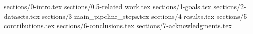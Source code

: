 %
\tableofcontents
{sections/0-intro.tex}
{sections/0.5-related work.tex}
{sections/1-goals.tex}
{sections/2-datasets.tex}
{sections/3-main_pipeline_steps.tex}
{sections/4-results.tex}
{sections/5-contributions.tex}
{sections/6-conclusions.tex}
{sections/7-acknowledgments.tex}